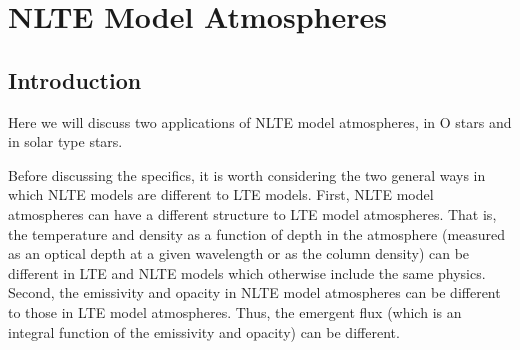 %
%
%
%
%
%

\newslide

\section{NLTE Model Atmospheres}

\subsection{Introduction}

Here we will discuss two applications of NLTE model atmospheres, in O stars and in solar type stars.

Before discussing the specifics, it is worth considering the two general ways in which NLTE models are different to LTE models. First, NLTE model atmospheres can have a different structure to LTE model atmospheres. That is, the temperature and density as a function of depth in the atmosphere (measured as an optical depth at a given wavelength or as the column density) can be different in LTE and NLTE models which otherwise include the same physics. Second, the emissivity and opacity in NLTE model atmospheres can be different to those in LTE model atmospheres. Thus, the emergent flux (which is an integral function of the emissivity and opacity) can be different.

